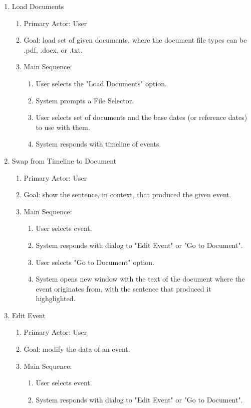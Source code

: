 \begin{enumerate}
  \item Load Documents
  \begin{enumerate}
    \item Primary Actor: User
    \item Goal: load set of given documents, where the document file types can be  .pdf, .docx, or .txt.
    \item Main Sequence:
	\begin{enumerate}
		\item User selects the "Load Documents" option.
		\item System prompts a File Selector.
		\item User selects set of documents and the base dates (or reference dates) to use with them.
		\item System responds with timeline of events.
	\end{enumerate}
  \end{enumerate}
  \item Swap from Timeline to Document
   \begin{enumerate}
	\item Primary Actor: User
	\item Goal: show the sentence, in context, that produced the given event.
	\item Main Sequence:
	\begin{enumerate}
		\item User selects event.
		\item System responds with dialog to "Edit Event" or "Go to Document".
		\item User selects "Go to Document" option.
		\item System opens new window with the text of the document where the event originates from, with the sentence that produced it highglighted.
	\end{enumerate}
    \end{enumerate}
   \item Edit Event
      \begin{enumerate}
	\item Primary Actor: User
	\item Goal: modify the data of an event.
	\item Main Sequence:
	\begin{enumerate}
		\item User selects event.
		\item System responds with dialog to "Edit Event" or "Go to Document".

\end{enumerate}
\end{enumerate}
\end{enumerate}

